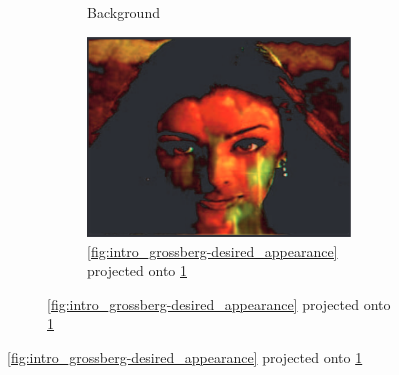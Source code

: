 \begin{figure}[ht]
\begin{subfigure}{0.8\textwidth}
\begin{subfigure}{0.3\textwidth}
            \caption{Background}
            \label{fig:intro_grossberg-background}
        \end{subfigure}
        \hfill
        \begin{subfigure}{0.3\textwidth}
            \centering
            \includegraphics[width=\textwidth]{images/01-uncompensated.png}
            \caption{\ref{fig:intro_grossberg-desired_appearance} projected onto \ref{fig:intro_grossberg-background}}
            \label{fig:intro_grossberg-uncompensated}
        \end{subfigure}
        

\end{subfigure}
\end{figure}
